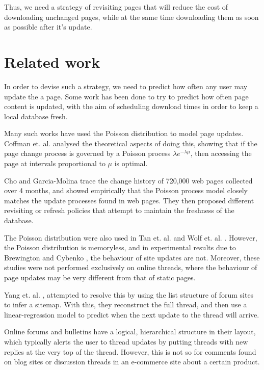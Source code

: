 \documentclass[12 pt]{article}
\begin{document}
Thus, we need a strategy of revisiting pages that will reduce the cost of downloading unchanged pages, while at the same time downloading them as soon as possible after it's update.

\section{Related work}
In order to devise such a strategy, we need to predict how often any user may update the a page. Some work has been done to try to predict how often page content is updated, with the aim of scheduling download times in order to keep a local database fresh.

Many such works have used the Poisson distribution to model page updates. Coffman et. al. \cite{Coffman1997} analysed the theoretical aspects of doing this, showing that if the page change process is governed by a Poisson process $\lambda e^{-\lambda \mu}$, then accessing the page at intervals proportional to $\mu$ is optimal.

Cho and Garcia-Molina trace the change history of 720,000 web pages collected over 4 months, and showed empirically that the Poisson process model closely matches the update processes found in web pages\cite{Cho1999}. They then proposed different revisiting or refresh policies \cite{Cho2003,Garcia-molina2003} that attempt to maintain the freshness of the database.


The Poisson distribution were also used in Tan et. al. \cite{Tan2007} and Wolf et. al. \cite{Wolf2002}. %
However, the Poisson distribution is memoryless, and in experimental results due to Brewington and Cybenko \cite{Brian2000}, the behaviour of site updates are not. Moreover, these studies were not performed exclusively on online threads, where the behaviour of page updates may be very different from that of static pages.

Yang et. al. \cite{Yang2009}, attempted to resolve this by using the list structure of forum sites to infer a sitemap. With this, they reconstruct the full thread, and then use a linear-regression model to predict when the next update to the thread will arrive. %

Online forums and bulletins have a logical, hierarchical structure in their layout, which typically alerts the user to thread updates by putting threads with new replies at the very top of the thread. However, this is not so for comments found on blog sites or discussion threads in an e-commerce site about a certain product.
\end{document}
